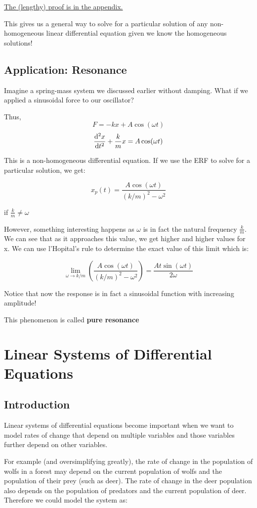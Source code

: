 \documentclass{report}
\begin{document}
\hyperref[sec:prVar]{The (lengthy) proof is in the appendix.}

This gives us a general way to solve for a particular solution of any non-homogeneous linear differential equation given we know the homogeneous solutions! 

\section{Application: Resonance}
Imagine a spring-mass system we discussed earlier without damping. What if we applied a sinusoidal force to our oscillator?

Thus,
$$F = -kx + A\cos(\omega t)$$
$$\dv[2]{x}{t} + \frac{k}{m}x = A\cos(\omega t)$$

This is a non-homogeneous differential equation. If we use the ERF to solve for a particular solution, we get:

$$x_p(t) = \frac{A\cos(\omega t)}{(k/m)^2-\omega^2}$$

if $\frac{k}{m} \neq \omega$

However, something interesting happens as $\omega$ is in fact the natural frequency $\frac{k}{m}$. We can see that as it approaches this value, we get higher and higher values for x. We can use l'Hopital's rule to determine the exact value of this limit which is:

$$\lim_{\omega \to k/m}(\frac{A\cos(\omega t)}{(k/m)^2-\omega^2}) = \frac{At\sin(\omega t)}{2\omega}$$


Notice that now the response is in fact a sinusoidal function with increasing amplitude!

This phenomenon is called \textbf{pure resonance}





\chapter{Linear Systems of Differential Equations}
\section{Introduction}
Linear systems of differential equations become important when we want to model rates of change that depend on multiple variables and those variables further depend on other variables.

For example (and oversimplifying greatly), the rate of change in the population of wolfs in a forest may depend on the current population of wolfs and the population of their prey (such as deer). The rate of change in the deer population also depends on the population of predators and the current population of deer. Therefore we could model the system as:
\end{document}
